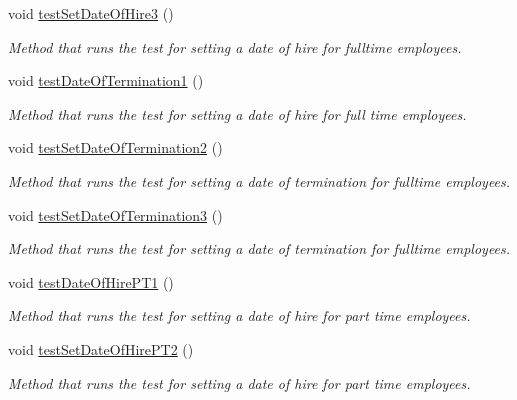 \begin{DoxyCompactItemize}
void \hyperlink{class_all_employees_test_1_1_all_employees_tests_a19b5b90b6d117a4d846aaf4e283b8c65}{test\+Set\+Date\+Of\+Hire3} ()
\begin{DoxyCompactList}\small\item\em Method that runs the test for setting a date of hire for fulltime employees. \end{DoxyCompactList}\item 
void \hyperlink{class_all_employees_test_1_1_all_employees_tests_ae362fd58ee4b0c43f82d84858150f570}{test\+Date\+Of\+Termination1} ()
\begin{DoxyCompactList}\small\item\em Method that runs the test for setting a date of hire for full time employees. \end{DoxyCompactList}\item 
void \hyperlink{class_all_employees_test_1_1_all_employees_tests_af5e7eba285b45877cb3be586006aa802}{test\+Set\+Date\+Of\+Termination2} ()
\begin{DoxyCompactList}\small\item\em Method that runs the test for setting a date of termination for fulltime employees. \end{DoxyCompactList}\item 
void \hyperlink{class_all_employees_test_1_1_all_employees_tests_aaa0b322857ca19c02d3254a41f88d195}{test\+Set\+Date\+Of\+Termination3} ()
\begin{DoxyCompactList}\small\item\em Method that runs the test for setting a date of termination for fulltime employees. \end{DoxyCompactList}\item 
void \hyperlink{class_all_employees_test_1_1_all_employees_tests_ad5788bc50b3d51ad30fc0845b46236ca}{test\+Date\+Of\+Hire\+P\+T1} ()
\begin{DoxyCompactList}\small\item\em Method that runs the test for setting a date of hire for part time employees. \end{DoxyCompactList}\item 
void \hyperlink{class_all_employees_test_1_1_all_employees_tests_ab95d88a6836de2907c402ec4c6a75a8e}{test\+Set\+Date\+Of\+Hire\+P\+T2} ()
\begin{DoxyCompactList}\small\item\em Method that runs the test for setting a date of hire for part time employees. \end{DoxyCompactList}\item 

\end{DoxyCompactItemize}
